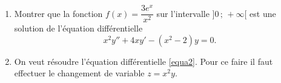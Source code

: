 \begin{exercice}\label{sujetjanvier2016ODE2}
  
\begin{enumerate}
\item Montrer que la fonction $f(x) = \dfrac{3e^x}{x^2}$ sur l'intervalle $]0\,;\,+\infty[$ est une solution de l'équation différentielle 
\begin{equation}\label{equa2}
  x^2y''+4xy'-(x^2-2)y=0.
\end{equation}
\item On veut résoudre l'équation différentielle \eqref{equa2}. Pour ce faire il faut effectuer le changement de variable $z=x^2y$.  
\end{enumerate}

\end{exercice}
